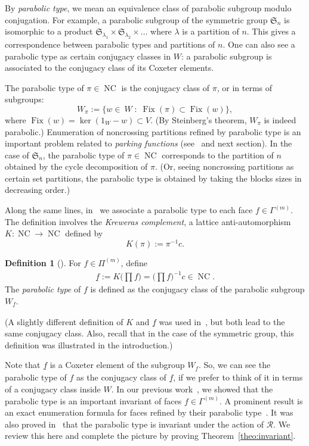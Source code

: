 \documentclass[11pt]{article}
\theoremstyle{definition}
\newtheorem{defi}[theo]{Definition}
\newcommand{\RR}{\mathcal{R}}
\DeclareMathOperator{\Fix}{Fix}
\DeclareMathOperator{\NC}{NC}
\begin{document}
By {\it parabolic type}, we mean an equivalence class of parabolic subgroup modulo conjugation.  For example, a parabolic subgroup of the symmetric group $\mathfrak{S}_n$ is isomorphic to a product $\mathfrak{S}_{\lambda_1}\times \mathfrak{S}_{\lambda_2} \times \dots$ where $\lambda$ is a partition of $n$.  This gives a correspondence between parabolic types and partitions of $n$.  One can also see a parabolic type as certain conjugacy classes in $W$:  a parabolic subgroup is associated to the conjugacy class of its Coxeter elements.

The parabolic type of $\pi\in\NC$ is the conjugacy class of $\pi$, or in terms of subgroups:
\[
    W_\pi := \{ w\in\ W \;:\; \Fix(\pi) \subset \Fix(w) \},
\]
where $\Fix(w) = \ker(1_W-w) \subset V$. (By Steinberg's theorem, $W_\pi$ is indeed parabolic.)  Enumeration of noncrossing partitions refined by parabolic type is an important problem related to {\it parking functions} (see~\cite{armstrongreinerrhoades} and next section).  In the case of $\mathfrak{S}_n$, the parabolic type of $\pi\in \NC$ corresponds to the partition of $n$ obtained by the cycle decomposition of $\pi$. (Or, seeing noncrossing partitions as certain set partitions, the parabolic type is obtained by taking the blocks sizes in decreasing order.)

Along the same lines, in~\cite{douvropoulosjosuatverges1,douvropoulosjosuatverges2} we associate a parabolic type to each face $f\in \Gamma^{(m)}$.  The definition involves the {\it Kreweras complement}, a lattice anti-automorphism $K:\NC\to\NC$ defined by
\[
    K(\pi) := \pi^{-1} c. 
\]

\begin{defi}[\cite{douvropoulosjosuatverges1}]
    For $f\in \Pi^{(m)}$, define 
    \begin{align}
        \underline{f} := K \big( \textstyle\prod f \big) = \big( \textstyle\prod f \big)^{-1} c \in \NC.
    \end{align}
    The {\it parabolic type} of $f$ is defined as the conjugacy class of the parabolic subgroup $W_{\underline{f}}$.
\end{defi}

(A slightly different definition of $K$ and $\underline{f}$ was used in~\cite{douvropoulosjosuatverges1}, but both lead to the same conjugacy class.  Also, recall that in the case of the symmetric group, this definition was illustrated in the introduction.) 

Note that $\underline{f}$ is a Coxeter element of the subgroup $W_{\underline{f}}$.  So, we can see the parabolic type of $f$ as the conjugacy class of $\underline{f}$, if we prefer to think of it in terms of a conjugacy class inside $W$.  In our previous work~\cite{douvropoulosjosuatverges1,douvropoulosjosuatverges2}, we showed that the parabolic type is an important invariant of faces $f \in \Gamma^{(m)}$.  A prominent result is an exact enumeration formula for faces refined by their parabolic type~\cite[Corollary~7.3]{douvropoulosjosuatverges1}.  It was also proved in~\cite[Proposition~11.1]{douvropoulosjosuatverges1} that the parabolic type is invariant under the action of $\RR$.  We review this here and complete the picture by proving Theorem~\ref{theo:invariant}.
\end{document}
